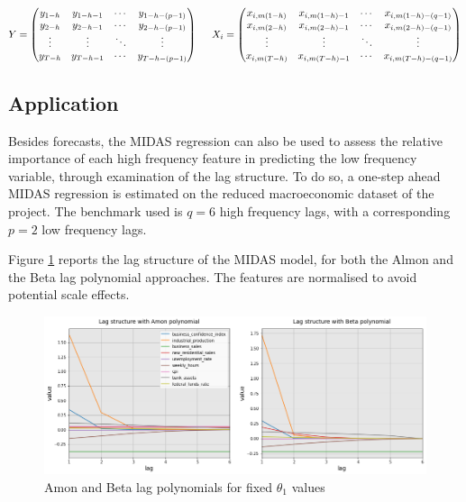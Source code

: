\begin{equation}
Y = \left( \begin{matrix} y_{1-h} & y_{1-h-1} & \cdots & y_{1-h-(p-1)} \\ y_{2-h} & y_{2-h-1} & \cdots & y_{2-h-(p-1)} \\ \vdots & \vdots & \ddots & \vdots \\ y_{T-h} & y_{T-h-1} & \cdots & y_{T-h-(p-1)} \end{matrix} \right) \hspace{5mm}
X_i = \left( \begin{matrix} x_{i,m(1-h)} & x_{i,m(1-h)-1} & \cdots & x_{i,m(1-h)-(q-1)} \\ x_{i,m(2-h)} & x_{i,m(2-h)-1} & \cdots & x_{i,m(2-h)-(q-1)} \\ \vdots & \vdots & \ddots & \vdots \\ x_{i,m(T-h)} & x_{i,m(T-h)-1} & \cdots & x_{i,m(T-h)-(q-1)} \end{matrix} \right)
\label{equation_c3_s2_ss3_4}
\end{equation}



\subsection{Application}
\label{chapter3_section2_subsection4}


Besides forecasts, the MIDAS regression can also be used to assess the relative importance of each high frequency feature in predicting the low frequency variable, through examination of the lag structure. To do so, a one-step ahead MIDAS regression is estimated on the reduced macroeconomic dataset of the project. The benchmark used is $q=6$ high frequency lags, with a corresponding $p=2$ low frequency lags. 

Figure \ref{fig_c3_s2_ss4_1} reports the lag structure of the MIDAS model, for both the Almon and the Beta lag polynomial approaches. The features are normalised to avoid potential scale effects. 

\newpage

\begin{figure}[H]
\centering
\includegraphics[scale=0.46]{images/lag_structure.png}
\caption{Amon and Beta lag polynomials for fixed $\theta_1$ values}
\label{fig_c3_s2_ss4_1}
\end{figure}

